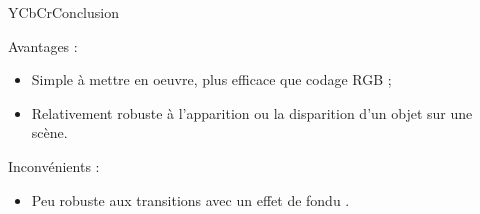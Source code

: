 \begin{frame}{YCbCr}{Conclusion}

\begin{block}{Avantages :}

\begin{itemize}
    \item Simple à mettre en oeuvre, plus efficace que codage RGB ;
    \item Relativement robuste à l'apparition ou la disparition d'un objet sur une scène.
\end{itemize}

\end{block}

\begin{block}{Inconvénients :}

\begin{itemize}
    \item Peu robuste aux transitions avec un effet de fondu .
\end{itemize}

\end{block}

\end{frame}

